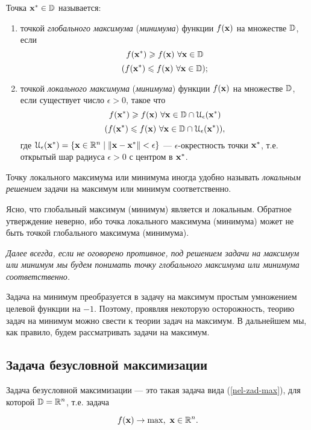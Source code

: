     Точка $\mathbf{x^{*}}\in\mathbb{D}$ называется:
\begin{enumerate}
  \item точкой \emph{глобального максимума} (\emph{минимума}) функции $f(\mathbf{x})$
    на множестве $\mathbb{D}$, если
    \[f(\mathbf{x^{*}})\geqslant f(\mathbf{x}) \ \forall \mathbf{x}\in\mathbb{D}\]
    \[(f(\mathbf{x^{*}})\leqslant f(\mathbf{x}) \ \forall \mathbf{x}\in\mathbb{D});\]
  \item точкой \emph{локального максимума} (\emph{минимума}) функции $f(\mathbf{x})$
    на множестве $\mathbb{D}$, если существует число $\epsilon>0$, такое что
    \[f(\mathbf{x^{*}})\geqslant f(\mathbf{x}) \
    \forall \mathbf{x}\in\mathbb{D}\cap\mathcal{U}_{\epsilon}(\mathbf{x^{*}})\]
    \[(f(\mathbf{x^{*}})\leqslant f(\mathbf{x}) \
    \forall \mathbf{x}\in\mathbb{D}\cap\mathcal{U}_{\epsilon}(\mathbf{x^{*}})),\]
    где $\mathcal{U}_{\epsilon}(\mathbf{x^{*}})
    =\{\mathbf{x}\in\mathbb{R}^{n}\mid \|\mathbf{x}-\mathbf{x^{*}}\|<\epsilon\}$ ---
    $\epsilon$-окрестность точки $\mathbf{x^{*}}$, т.е.
    открытый шар радиуса $\epsilon>0$ с центром в $\mathbf{x^{*}}$.
\end{enumerate}




    Точку локального максимума или минимума иногда удобно называть
    \emph{локальным решением} задачи на максимум или  минимум соответственно.

    Ясно, что глобальный максимум (минимум) является и локальным.
    Обратное утверждение неверно, ибо точка локального максимума
    (минимума) может не быть точкой глобального максимума (минимума).

    \emph{Далее всегда, если не оговорено противное, под решением задачи
    на максимум или минимум мы будем понимать точку
    глобального максимума или минимума соответственно.}


    Задача на минимум преобразуется в задачу на максимум простым
    умножением целевой функции на $-1$. Поэтому, проявляя некоторую
    осторожность, теорию задач на минимум можно свести к теории
    задач на максимум. В дальнейшем мы, как правило, будем
    рассматривать задачи на максимум.


\subsection{Задача безусловной максимизации}
    Задача безусловной максимизации --- это такая задача вида
    (\ref{nel-zad-max}), для которой $\mathbb{D}=\mathbb{R}^{n}$, т.е. задача

\begin{equation}
\label{nel-zad-bez}
    f(\mathbf{x})\rightarrow\max, \ \mathbf{x}\in\mathbb{R}^{n}.
\end{equation}



